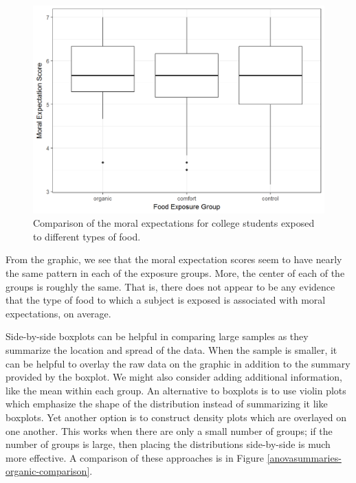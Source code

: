 \documentclass[]{book}
\theoremstyle{definition}
\theoremstyle{definition}
\theoremstyle{remark}
\begin{document}
\begin{figure}

{\centering \includegraphics[width=0.8\linewidth]{./Images/anovasummaries-organic-boxplot-1} 

}

\caption{Comparison of the moral expectations for college students exposed to different types of food.}\label{fig:anovasummaries-organic-boxplot}
\end{figure}

From the graphic, we see that the moral expectation scores seem to have
nearly the same pattern in each of the exposure groups. More, the center
of each of the groups is roughly the same. That is, there does not
appear to be any evidence that the type of food to which a subject is
exposed is associated with moral expectations, on average.

Side-by-side boxplots can be helpful in comparing large samples as they
summarize the location and spread of the data. When the sample is
smaller, it can be helpful to overlay the raw data on the graphic in
addition to the summary provided by the boxplot. We might also consider
adding additional information, like the mean within each group. An
alternative to boxplots is to use violin plots which emphasize the shape
of the distribution instead of summarizing it like boxplots. Yet another
option is to construct density plots which are overlayed on one another.
This works when there are only a small number of groups; if the number
of groups is large, then placing the distributions side-by-side is much
more effective. A comparison of these approaches is in Figure
\ref{anovasummaries-organic-comparison}.
\end{document}

